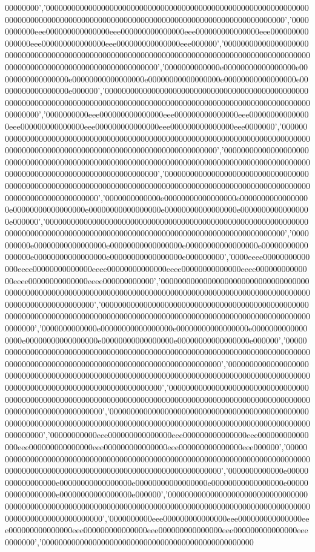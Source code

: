 00000000','00000000000000000000000000000000000000000000000000000000000000000000000000000000000000000000000000000000000000000000000000000000','00000000000eee000000000000000eee000000000000000eee000000000000000eee000000000000000eee000000000000000eee000000000000000eee000000','00000000000000000000000000000000000000000000000000000000000000000000000000000000000000000000000000000000000000000000000000000000','0000000000000e00000000000000000e00000000000000000e00000000000000000e00000000000000000e00000000000000000e00000000000000000e000000','00000000000000000000000000000000000000000000000000000000000000000000000000000000000000000000000000000000000000000000000000000000','0000000000eee000000000000000eee000000000000000eee000000000000000eee000000000000000eee000000000000000eee000000000000000eee0000000','00000000000000000000000000000000000000000000000000000000000000000000000000000000000000000000000000000000000000000000000000000000','00000000000000000000000000000000000000000000000000000000000000000000000000000000000000000000000000000000000000000000000000000000','00000000000000000000000000000000000000000000000000000000000000000000000000000000000000000000000000000000000000000000000000000000','0000000000000e00000000000000000e00000000000000000e00000000000000000e00000000000000000e00000000000000000e00000000000000000e000000','00000000000000000000000000000000000000000000000000000000000000000000000000000000000000000000000000000000000000000000000000000000','0000000000e00000000000000000e00000000000000000e00000000000000000e00000000000000000e00000000000000000e00000000000000000e000000000','0000eeee00000000000000eeee00000000000000eeee00000000000000eeee00000000000000eeee00000000000000eeee00000000000000eeee000000000000','00000000000000000000000000000000000000000000000000000000000000000000000000000000000000000000000000000000000000000000000000000000','00000000000000000000000000000000000000000000000000000000000000000000000000000000000000000000000000000000000000000000000000000000','0000000000000e00000000000000000e00000000000000000e00000000000000000e00000000000000000e00000000000000000e00000000000000000e000000','00000000000000000000000000000000000000000000000000000000000000000000000000000000000000000000000000000000000000000000000000000000','00000000000000000000000000000000000000000000000000000000000000000000000000000000000000000000000000000000000000000000000000000000','00000000000000000000000000000000000000000000000000000000000000000000000000000000000000000000000000000000000000000000000000000000','00000000000000000000000000000000000000000000000000000000000000000000000000000000000000000000000000000000000000000000000000000000','00000000000eee000000000000000eee000000000000000eee000000000000000eee000000000000000eee000000000000000eee000000000000000eee000000','00000000000000000000000000000000000000000000000000000000000000000000000000000000000000000000000000000000000000000000000000000000','0000000000000e00000000000000000e00000000000000000e00000000000000000e00000000000000000e00000000000000000e00000000000000000e000000','00000000000000000000000000000000000000000000000000000000000000000000000000000000000000000000000000000000000000000000000000000000','0000000000eee000000000000000eee000000000000000eee000000000000000eee000000000000000eee000000000000000eee000000000000000eee0000000','00000000000000000000000000000000000000000000000000